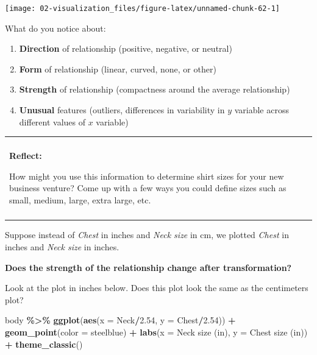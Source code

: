 \documentclass[
]{book}
\newenvironment{Shaded}{\begin{snugshade}}{\end{snugshade}}
\newcommand{\AttributeTok}[1]{\textcolor[rgb]{0.13,0.29,0.53}{#1}}
\newcommand{\FloatTok}[1]{\textcolor[rgb]{0.00,0.00,0.81}{#1}}
\newcommand{\FunctionTok}[1]{\textcolor[rgb]{0.13,0.29,0.53}{\textbf{#1}}}
\newcommand{\NormalTok}[1]{#1}
\newcommand{\SpecialCharTok}[1]{\textcolor[rgb]{0.81,0.36,0.00}{\textbf{#1}}}
\newcommand{\StringTok}[1]{\textcolor[rgb]{0.31,0.60,0.02}{#1}}
\providecommand{\tightlist}{%
  \setlength{\itemsep}{0pt}\setlength{\parskip}{0pt}}
\newenvironment{reflect}
{
    \begin{center}
    
    \begin{tabular}{|p{0.8\textwidth}|}
    \rowcolor{LightBlue}
    \hline\\
    \rowcolor{LightBlue}
    \textbf{Reflect:}
}
{
    \\\rowcolor{LightBlue}
    \\\hline
    \end{tabular} 
    \end{center}
}
\begin{document}
\begin{center}\texttt{[image: 02-visualization\_files/figure-latex/unnamed-chunk-62-1]} \end{center}

What do you notice about:

\begin{enumerate}
\def\labelenumi{\arabic{enumi}.}
\tightlist
\item
  \textbf{Direction} of relationship (positive, negative, or neutral)
\item
  \textbf{Form} of relationship (linear, curved, none, or other)
\item
  \textbf{Strength} of relationship (compactness around the average relationship)
\item
  \textbf{Unusual} features (outliers, differences in variability in \(y\) variable across different values of \(x\) variable)
\end{enumerate}

\begin{reflect}
How might you use this information to determine shirt sizes for your new
business venture? Come up with a few ways you could define sizes such as
small, medium, large, extra large, etc.
\end{reflect}

Suppose instead of \emph{Chest} in inches and \emph{Neck size} in cm, we plotted \emph{Chest} in inches and \emph{Neck size} in inches.

\textbf{Does the strength of the relationship change after transformation?}

Look at the plot in inches below. Does this plot look the same as the centimeters plot?

\begin{Shaded}
\begin{Highlighting}[]
\NormalTok{body }\SpecialCharTok{\%\textgreater{}\%}
  \FunctionTok{ggplot}\NormalTok{(}\FunctionTok{aes}\NormalTok{(}\AttributeTok{x =}\NormalTok{ Neck}\SpecialCharTok{/}\FloatTok{2.54}\NormalTok{, }\AttributeTok{y =}\NormalTok{ Chest}\SpecialCharTok{/}\FloatTok{2.54}\NormalTok{)) }\SpecialCharTok{+}
  \FunctionTok{geom\_point}\NormalTok{(}\AttributeTok{color =} \StringTok{\textquotesingle{}steelblue\textquotesingle{}}\NormalTok{) }\SpecialCharTok{+} 
  \FunctionTok{labs}\NormalTok{(}\AttributeTok{x =} \StringTok{\textquotesingle{}Neck size (in)\textquotesingle{}}\NormalTok{, }\AttributeTok{y =} \StringTok{\textquotesingle{}Chest size (in)\textquotesingle{}}\NormalTok{) }\SpecialCharTok{+}
  \FunctionTok{theme\_classic}\NormalTok{()}
\end{Highlighting}
\end{Shaded}
\end{document}
